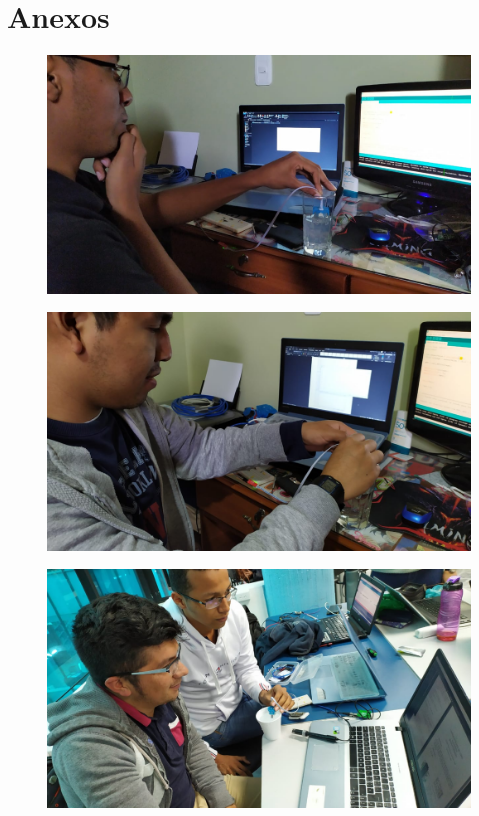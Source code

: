 \documentclass[10pt,a4paper]{article}
\begin{document}
\section{Anexos }
\begin{multicols}{2}
\begin{figure}[H]
\centering
\includegraphics[scale=0.15]{anexo3}
\end{figure}
\begin{figure}[H]
\centering
\includegraphics[scale=0.15]{anexo4}
\end{figure}
\begin{figure}[H]
\centering
\includegraphics[scale=0.15]{anexo2}

\end{figure}
\end{multicols}
\end{document}
